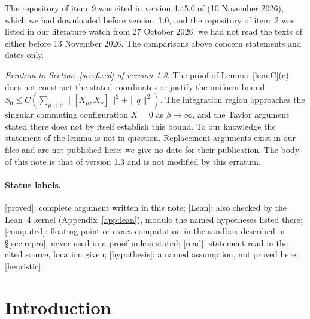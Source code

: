\documentclass[11pt,a4paper]{article}
\theoremstyle{plain}
\theoremstyle{definition}
\theoremstyle{remark}
\numberwithin{equation}{section}
\newcommand{\st}[1]{\textsf{[#1]}}
\begin{document}
The repository of item~9 was cited in version 4.45.0 of \cite{BB26} (10 November 2026), which we had downloaded before version~1.0, and the repository of item~2 was listed in our literature watch from 27 October 2026; we had not read the texts of either before 13 November 2026. The comparisons above concern statements and dates only.
\par\medskip\noindent\textit{Erratum to Section~\ref{sec:fixed} of version 1.3.} The proof of Lemma~\ref{lem:C}(c) does not construct the stated coordinates or justify the uniform bound $S_0\le C(\sum_{\mu<\nu}\|[X_\mu,X_\nu]\|^2+\|q\|^2)$. The integration region approaches the singular commuting configuration $X=0$ as $\beta\to\infty$, and the Taylor argument stated there does not by itself establish this bound. To our knowledge the statement of the lemma is not in question. Replacement arguments exist in our files and are not published here; we give no date for their publication. The body of this note is that of version 1.3 and is not modified by this erratum.
\endgroup


\paragraph{Status labels.}
\st{proved}: complete argument written in this note; \st{Lean}: also checked by the Lean~4 kernel (Appendix~\ref{app:lean}), modulo
the named hypotheses listed there; \st{computed}: floating-point or exact computation in the sandbox described in
\S\ref{sec:repro}, never used in a proof unless stated; \st{read}: statement read in the cited source, location given;
\st{hypothesis}: a named assumption, not proved here; \st{heuristic}.

{\small\setcounter{tocdepth}{1}\tableofcontents}

\section{Introduction}\label{sec:intro}
\end{document}
